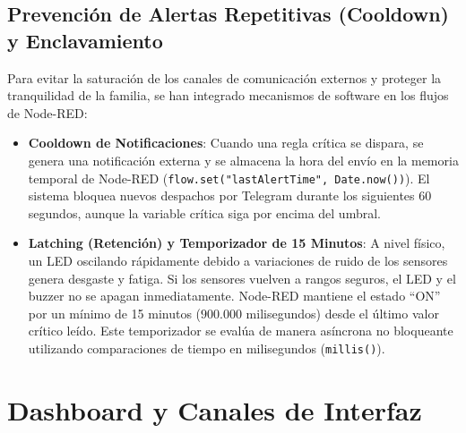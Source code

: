 \documentclass[12pt,letterpaper]{article}
\begin{document}
\subsection{Prevención de Alertas Repetitivas (Cooldown) y Enclavamiento}
Para evitar la saturación de los canales de comunicación externos y proteger la tranquilidad de la familia, se han integrado mecanismos de software en los flujos de Node-RED:
\begin{itemize}
    \item \textbf{Cooldown de Notificaciones}: Cuando una regla crítica se dispara, se genera una notificación externa y se almacena la hora del envío en la memoria temporal de Node-RED (\texttt{flow.set("lastAlertTime", Date.now())}). El sistema bloquea nuevos despachos por Telegram durante los siguientes 60 segundos, aunque la variable crítica siga por encima del umbral.
    \item \textbf{Latching (Retención) y Temporizador de 15 Minutos}: A nivel físico, un LED oscilando rápidamente debido a variaciones de ruido de los sensores genera desgaste y fatiga. Si los sensores vuelven a rangos seguros, el LED y el buzzer no se apagan inmediatamente. Node-RED mantiene el estado ``ON'' por un mínimo de 15 minutos ($900.000$ milisegundos) desde el último valor crítico leído. Este temporizador se evalúa de manera asíncrona no bloqueante utilizando comparaciones de tiempo en milisegundos (\texttt{millis()}).
\end{itemize}

\newpage
\section{Dashboard y Canales de Interfaz}
\end{document}
